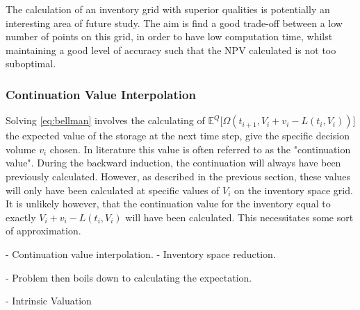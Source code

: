 \documentclass{article}
\begin{document}
\bigskip
The calculation of an inventory grid with superior qualities is potentially an interesting 
area of future study. The aim is find a good trade-off between a low number of points
on this grid, in order to have low computation time, whilst maintaining a good level
of accuracy such that the NPV calculated is not too suboptimal.

\subsubsection{Continuation Value Interpolation}
Solving \ref{eq:bellman} involves the calculating of $\mathbb{E}^Q \biggl[
\Omega(t_{i+1}, V_i + v_i - L(t_i, V_i)) \biggr]$
the expected value of the storage at the next time step, give the specific decision volume
$v_i$ chosen. In literature this value is often referred to as the "continuation value".
During the backward induction, the continuation will always have 
been previously calculated. However, as described in the previous section, these values 
will only have been calculated at specific values of $V_i$ on the inventory space grid.
It is unlikely however, that the continuation value for the inventory equal to exactly 
$V_i + v_i - L(t_i, V_i)$ will have been calculated. This necessitates some sort of 
approximation. 

- Continuation value interpolation. 
- Inventory space reduction.
\bigskip
\bigskip



- Problem then boils down to calculating the expectation.

- Intrinsic Valuation
\end{document}
